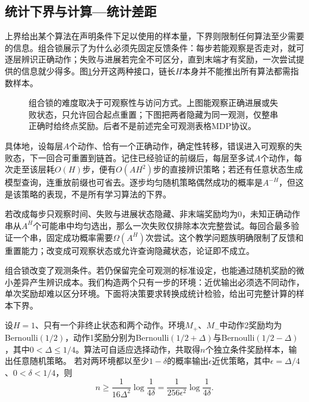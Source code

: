 \subsection{统计下界与计算—统计差距}
\label{sec:rl-learning-statistical-lower}

上界给出某个算法在声明条件下足以使用的样本量，下界则限制任何算法至少需要的信息。组合锁展示了为什么必须先固定反馈条件：每步若能观察是否走对，就可逐层辨识正确动作；失败与进展若完全不可区分，直到末端才有奖励，一次尝试提供的信息就少得多。图\ref{fig:rl-learning-combination-lock}分开这两种接口，链长$H$本身并不能推出所有算法都需指数样本。

\begin{figure}[t]
  \centering
  
  \caption{组合锁的难度取决于可观察性与访问方式。上图能观察正确进展或失败状态，只允许回合起点重置；下图把两者隐藏为同一观测，仅整串正确时给终点奖励。后者不是前述完全可观测表格MDP协议。}
  \label{fig:rl-learning-combination-lock}
\end{figure}

具体地，设每层$A$个动作、恰有一个正确动作，确定性转移，错误进入可观察的失败态，下一回合可重置到链首。记住已经验证的前缀后，每层至多试$A$个动作，每次走至该层耗$O(H)$步，便有$O(AH^2)$步的直接辨识策略；若还有任意状态生成模型查询，连重放前缀也可省去。逐步均匀随机策略偶然成功的概率是$A^{-H}$，但这是该策略的表现，不是所有学习算法的下界。

若改成每步只观察时间、失败与进展状态隐藏、非末端奖励均为0，未知正确动作串从$A^H$个可能串中均匀选出，那么一次失败仅排除本次完整尝试。每回合最多验证一个串，固定成功概率需要$\Omega(A^H)$次尝试。这个教学问题族明确限制了反馈和重置能力；改变成可观察状态或允许查询隐藏状态，论证即不成立。

组合锁改变了观测条件。若仍保留完全可观测的标准设定，也能通过随机奖励的微小差异产生辨识成本。我们构造两个只有一步的环境：近优输出必须选不同动作，单次奖励却难以区分环境。下面将决策要求转换成统计检验，给出可完整计算的样本下界。

\begin{theorem}[一步决策的辨识下界]
  \label{thm:rl-learning-two-instance-lower}
  设$H=1$、只有一个非终止状态和两个动作。环境$M_+$、$M_-$中动作2奖励均为Bernoulli$(1/2)$，动作1奖励分别为Bernoulli$(1/2+\Delta)$与Bernoulli$(1/2-\Delta)$，其中$0<\Delta\leq1/4$。算法可自适应选择动作，共取得$n$个独立条件奖励样本，输出任意随机策略。
  若对两环境都以至少$1-\delta$的概率输出$\epsilon$近优策略，其中$\epsilon=\Delta/4$、$0<\delta<1/4$，则
  \[
     n\geq\frac{1}{16\Delta^2}\log\frac1{4\delta}
       =\frac{1}{256\epsilon^2}\log\frac1{4\delta}.
  \]
\end{theorem}

